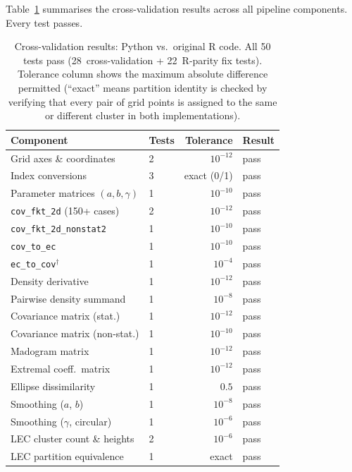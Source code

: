 \documentclass[a4paper]{elsarticle}
\begin{document}
Table~\ref{tab:verification} summarises the cross-validation results
across all pipeline components.  Every test passes.

\begin{table}[ht]
\caption{Cross-validation results: Python vs.\ original R code.
  All 50 tests pass (28~cross-validation + 22~R-parity fix tests).
  Tolerance column shows the maximum absolute
  difference permitted (``exact'' means partition identity is checked
  by verifying that every pair of grid points is assigned to the
  same or different cluster in both implementations).}
\label{tab:verification}
\centering
\footnotesize
\begin{tabular}{@{}p{3.6cm}lrl@{}}
\toprule
\textbf{Component} & \textbf{Tests} & \textbf{Tolerance} & \textbf{Result} \\
\midrule
Grid axes \& coordinates     & 2  & $10^{-12}$ & pass \\
Index conversions             & 3  & exact (0/1)& pass \\
Parameter matrices $(a,b,\gamma)$ & 1 & $10^{-10}$ & pass \\
\texttt{cov\_fkt\_2d} (150+ cases)& 2 & $10^{-12}$ & pass \\
\texttt{cov\_fkt\_2d\_nonstat2}   & 1 & $10^{-10}$ & pass \\
\texttt{cov\_to\_ec}              & 1 & $10^{-10}$ & pass \\
\texttt{ec\_to\_cov}$^{\dagger}$  & 1 & $10^{-4}$  & pass \\
Density derivative                & 1 & $10^{-12}$ & pass \\
Pairwise density summand      & 1  & $10^{-8}$  & pass \\
Covariance matrix (stat.)     & 1  & $10^{-12}$ & pass \\
Covariance matrix (non-stat.) & 1  & $10^{-10}$ & pass \\
Madogram matrix               & 1  & $10^{-12}$ & pass \\
Extremal coeff.\ matrix       & 1  & $10^{-12}$ & pass \\
Ellipse dissimilarity         & 1  & $0.5$      & pass \\
Smoothing ($a$, $b$)          & 1  & $10^{-8}$  & pass \\
Smoothing ($\gamma$, circular)& 1  & $10^{-6}$  & pass \\
LEC cluster count \& heights  & 2  & $10^{-6}$  & pass \\
LEC partition equivalence     & 1  & exact      & pass \\

\end{tabular}
\end{table}
\end{document}
